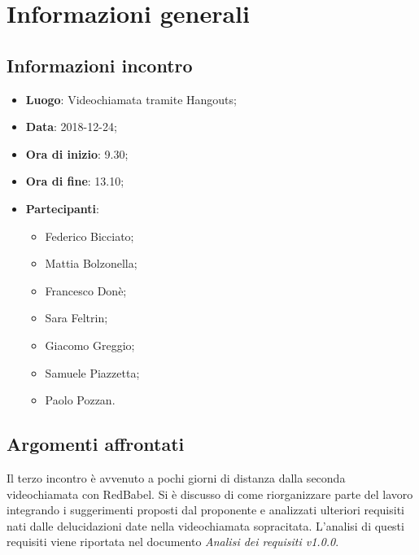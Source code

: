 \section{Informazioni generali}

\subsection{Informazioni incontro}
\begin{itemize}
\item \textbf{Luogo}: Videochiamata tramite Hangouts;
\item \textbf{Data}: 2018-12-24;
\item \textbf{Ora di inizio}: 9.30;
\item \textbf{Ora di fine}: 13.10;
\item \textbf{Partecipanti}:
\begin{itemize}
	\item Federico Bicciato;
	\item Mattia Bolzonella;
	\item Francesco Donè;
	\item Sara Feltrin;
	\item Giacomo Greggio;
	\item Samuele Piazzetta;
	\item Paolo Pozzan.
\end{itemize}
\end{itemize}

\subsection{Argomenti affrontati}
Il terzo incontro è avvenuto a pochi giorni di distanza dalla seconda videochiamata
con RedBabel. Si è discusso di come riorganizzare parte del lavoro integrando 
i suggerimenti proposti dal proponente e analizzati ulteriori requisiti nati dalle
delucidazioni date nella videochiamata sopracitata. L'analisi di questi requisiti 
viene riportata nel documento \textit{Analisi dei requisiti v1.0.0}.
